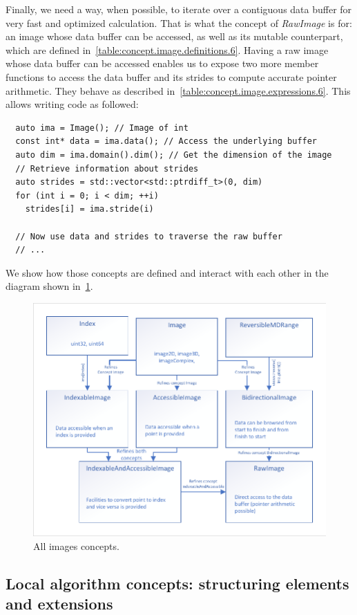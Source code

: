 Finally, we need a way, when possible, to iterate over a contiguous data buffer for very fast and optimized calculation.
That is what the concept of \emph{RawImage} is for: an image whose data buffer can be accessed, as well as its mutable
counterpart, which are defined in~\cref{table:concept.image.definitions.6}. Having a raw image whose data buffer can be
accessed enables us to expose two more member functions to access the data buffer and its strides to compute accurate
pointer arithmetic. They behave as described in~\cref{table:concept.image.expressions.6}. This allows writing code as
followed:
\begin{verbatim}
  auto ima = Image(); // Image of int
  const int* data = ima.data(); // Access the underlying buffer
  auto dim = ima.domain().dim(); // Get the dimension of the image
  // Retrieve information about strides
  auto strides = std::vector<std::ptrdiff_t>(0, dim)
  for (int i = 0; i < dim; ++i)
    strides[i] = ima.stride(i)

  // Now use data and strides to traverse the raw buffer
  // ...
\end{verbatim}

We show how those concepts are defined and interact with each other in the diagram shown in~\cref{fig:concept.images}.

\begin{figure}[htbp]
  \centering
  \includegraphics[width=.8\linewidth]{../figures/concepts/images_all}
  \caption{All images concepts.}
  \label{fig:concept.images}
\end{figure}


\subsection{Local algorithm concepts: structuring elements and extensions}
\label{subsec:local.se.ext}


